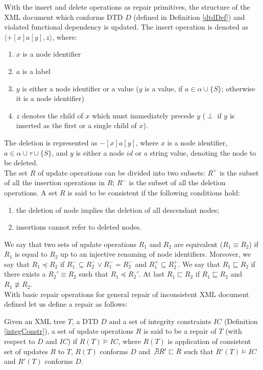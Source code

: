 With the insert and delete operations as repair primitives, the structure of the XML document which conforms DTD $D$ (defined in Definition \ref{dtdDef}) and violated functional dependency is updated. The insert operation is denoted as $\langle  + [x]a[y], z\rangle$, where:
\begin{enumerate}
\renewcommand{\labelenumi}{\roman{enumi})}
	\item $x$ is a node identifier
    \item $a$ is a label
    \item $y$ is either a node identifier or a value ($y$ is a value, if $a \in \alpha \cup \{S\}$; otherwise it is a node identifier)
    \item $z$ denotes the child of $x$ which must immediately precede $y$ ($\perp$ if $y$ is inserted as the first or a single child of $x$).
\end{enumerate}

The deletion is represented as $-[x]a[y]$, where $x$ is a node identifier, $a \in \alpha \cup \tau \cup \{S\}$, and $y$ is either a node $id$ or a string value, denoting the node to be deleted.\\
The set $R$ of update operations can be divided into two subsets: $R^+$ is the subset of all the insertion operations in $R$; $R^-$ is the subset of all the deletion operations. A set $R$ is said to be consistent if the following conditions hold:
\begin{enumerate}
	\item the deletion of node implies the deletion of all descendant nodes;
    \item insertions cannot refer to deleted nodes.
\end{enumerate}
We say that two sets of update operations $R_1$ and $R_2$ are equivalent ($R_1 \equiv R_2$) if $R_1$ is equal to $R_2$ up to an injective renaming of node identifiers. Moreover, we say that $R_1 \preceq R_2$ if $R_1^- \subseteq R_2^- \lor R_1^- = R_2^-$ and $R_1^+ \subseteq R_2^+$. We say that $R_1 \sqsubseteq R_2$ if there exists a $R_2' \equiv R_2$ such that  $R_1 \preceq R_2'$. At last $R_1 \sqsubset R_2$ if $R_1 \sqsubseteq R_2$ and $R_1 \not \equiv R_2$.\\

With basic repair operations for general repair of inconsistent XML document defined let us define a repair as follows:

\begin{define}[Repair]
Given an XML tree $T$, a DTD $D$ and a set of integrity constraints $IC$ (Definition \ref{integConstr}), a set of update operations $R$ is said to be a repair of $T$ (with respect to $D$ and $IC$) if $R(T) \models IC$, where $R(T)$ is application of consistent set of updates $R$ to $T$, $R(T)$ conforms $D$ and $\not \exists R' \sqsubset R$ such that $R'(T) \models IC$ and $R'(T)$ conforms $D$.
\end{define}

